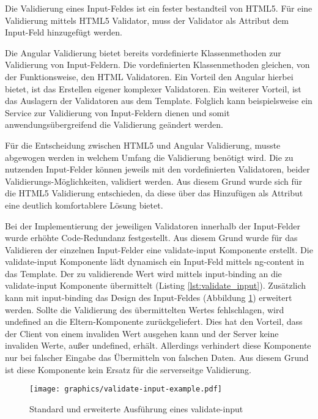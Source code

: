 \begin{description}
	Die Validierung eines Input-Feldes ist ein fester bestandteil von \gls{HTML}5. Für eine Validierung mittels \gls{HTML}5 Validator, muss der Validator als Attribut dem Input-Feld hinzugefügt werden. 
	
	Die Angular Validierung bietet bereits vordefinierte Klassenmethoden zur Validierung von Input-Feldern. Die vordefinierten Klassenmethoden gleichen, von der Funktionsweise, den HTML Validatoren. Ein Vorteil den Angular hierbei bietet, ist das Erstellen eigener komplexer Validatoren. Ein weiterer Vorteil, ist das Auslagern der Validatoren aus dem Template. Folglich kann beispielsweise ein Service zur Validierung von Input-Feldern dienen und somit anwendungsübergreifend die Validierung geändert werden.

	Für die Entscheidung zwischen \gls{HTML}5 und Angular Validierung, musste abgewogen werden in welchem Umfang die Validierung benötigt wird. Die zu nutzenden Input-Felder können jeweils mit den vordefinierten Validatoren, beider Validierungs-Möglichkeiten, validiert werden. Aus diesem Grund wurde sich für die \gls{HTML}5 Validierung entschieden, da diese über das Hinzufügen als Attribut eine deutlich komfortablere Lösung bietet.

		Bei der Implementierung der jeweiligen Validatoren innerhalb der Input-Felder wurde erhöhte Code-Redundanz festgestellt. Aus diesem Grund wurde für das Validieren der einzelnen Input-Felder eine validate-input Komponente erstellt. Die validate-input Komponente lädt dynamisch ein Input-Feld mittels ng-content in das Template. Der zu validierende Wert wird mittels input-binding an die validate-input Komponente übermittelt (Listing \ref{lst:validate_input}). Zusätzlich kann mit input-binding das Design des Input-Feldes (Abbildung \ref{fig:validate_input}) erweitert werden. Sollte die Validierung des übermittelten Wertes fehlschlagen, wird undefined an die Eltern-Komponente zurückgeliefert. Dies hat den Vorteil, dass der Client von einem invaliden Wert ausgehen kann und der Server keine invaliden Werte, au{\ss}er undefined, erhält. Allerdings verhindert diese Komponente nur bei falscher Eingabe das Übermitteln von falschen Daten. Aus diesem Grund ist diese Komponente kein Ersatz für die serverseitge Validierung.

	\begin{figure}
		\centering
		\texttt{[image: graphics/validate-input-example.pdf]}
		\caption{Standard und erweiterte Ausführung eines validate-input}
		\label{fig:validate_input}
	\end{figure}

	\begin{minipage}{\linewidth}
			
	\end{minipage}
\end{description}

